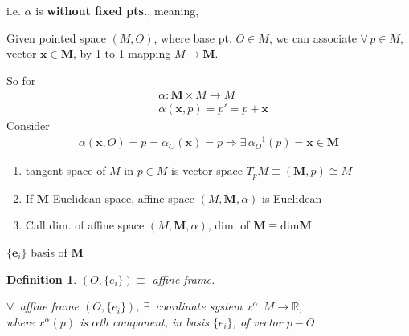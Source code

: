 \documentclass[10pt]{amsart}
\newtheorem{definition}{Definition}
\begin{document}
\begin{multicols*}{2}
i.e. $\alpha$ is \textbf{without fixed pts.}, meaning, 

Given pointed space $(M, O)$, where base pt. $O\in M$, we can associate $\forall \, p \in M$, vector $\mathbf{x} \in \mathbf{M}$, by 1-to-1 mapping $M\to \mathbf{M}$. 

So for 
\[
\begin{aligned}
& \alpha : \mathbf{M} \times M \to M \\ 
& \alpha(\mathbf{x}, p) = p' = p + \mathbf{x}
\end{aligned}
\]
Consider 
\[
\begin{gathered}
	\alpha(\mathbf{x}, O) = p = \alpha_O(\mathbf{x}) = p \Longrightarrow \exists \, \alpha_O^{-1}(p) = \mathbf{x} \in \mathbf{M}
\end{gathered}
\]

\begin{enumerate}
	\item tangent space of $M$ in $p\in M$ is vector space $T_pM \equiv (\mathbf{M}, p) \cong M$
	\item If $\mathbf{M}$ Euclidean space, affine space $(M, \mathbf{M}, \alpha)$ is Euclidean
	\item Call dim. of affine space $(M, \mathbf{M}, \alpha)$, dim. of $\mathbf{M} \equiv \text{dim}{\mathbf{M}}$
\end{enumerate}
$\lbrace \mathbf{e}_i \rbrace$ basis of $\mathbf{M}$




\begin{definition}
  $(O, \lbrace e_i \rbrace) \equiv $ affine frame.

  $\forall \, $ affine frame $(O,\lbrace e_i \rbrace)$, $\exists \, $ coordinate system $x^{\alpha} : M \to \mathbb{R}$, \\
  where $x^{\alpha}(p)$ is $\alpha$th component, in basis $\lbrace e_i \rbrace$, of vector $p-O$
  \end{definition}


\end{multicols*}
\end{document}
